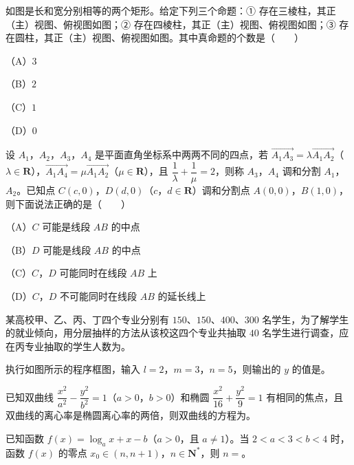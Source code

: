 \begin{question}
如图是长和宽分别相等的两个矩形。给定下列三个命题：① 存在三棱柱，其正（主）视图、俯视图如图；② 存在四棱柱，其正（主）视图、俯视图如图；③ 存在圆柱，其正（主）视图、俯视图如图。其中真命题的个数是\mbox{（　　）}

（A）$3$

（B）$2$

（C）$1$

（D）$0$
\nopagebreak[4]
\begin{center}\end{center}
\nopagebreak[4]
\end{question}
\begin{question}
设 $A_1$，$A_2$，$A_3$，$A_4$ 是平面直角坐标系中两两不同的四点，若 $\overrightarrow{A_1A_3}=\lambda\overrightarrow{A_1A_2}$（$\lambda\in\mathbf R$），$\overrightarrow{A_1A_4}=\mu\overrightarrow{A_1A_2}$（$\mu\in\mathbf R$），且 $\dfrac1\lambda+\dfrac1\mu=2$，则称 $A_3$，$A_4$ 调和分割 $A_1$，$A_2$。已知点 $C(c,0)$，$D(d,0)$（$c$，$d\in\mathbf R$）调和分割点 $A(0,0)$，$B(1,0)$，则下面说法正确的是\mbox{（　　）}

（A）$C$ 可能是线段 $AB$ 的中点

（B）$D$ 可能是线段 $AB$ 的中点

（C）$C$，$D$ 可能同时在线段 $AB$ 上

（D）$C$，$D$ 不可能同时在线段 $AB$ 的延长线上

\end{question}

\begin{question}
某高校甲、乙、丙、丁四个专业分别有 $150$、$150$、$400$、$300$ 名学生，为了解学生的就业倾向，用分层抽样的方法从该校这四个专业共抽取 $40$ 名学生进行调查，应在丙专业抽取的学生人数为\gkblank{}。

\Needspace{0.4\textheight}
\end{question}
\begin{question}
执行如图所示的程序框图，输入 $l=2$，$m=3$，$n=5$，则输出的 $y$ 的值是\gkblank{}。
\nopagebreak[4]
\begin{center}\end{center}
\nopagebreak[4]
\end{question}
\begin{question}
已知双曲线 $\dfrac{x^2}{a^2}-\dfrac{y^2}{b^2}=1$（$a>0$，$b>0$）和椭圆 $\dfrac{x^2}{16}+\dfrac{y^2}{9}=1$ 有相同的焦点，且双曲线的离心率是椭圆离心率的两倍，则双曲线的方程为\gkblank{}。

\end{question}
\begin{question}
已知函数 $f(x)=\log_a x+x-b$（$a>0$，且 $a\neq 1$）。当 $2<a<3<b<4$ 时，函数 $f(x)$ 的零点 $x_0\in(n,n+1)$，$n\in\mathbf N^*$，则 $n=$\gkblank{}。

\end{question}


